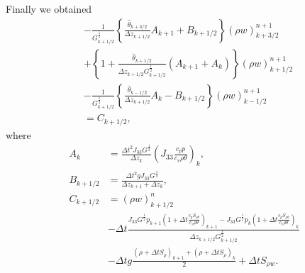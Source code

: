 Finally we obtained
\begin{align}
  &-\frac{1}{G^{\frac{1}{2}}_{k+1/2}}\left\{
    \frac{\hat{\theta}_{k+3/2}}{\Delta z_{k+1/2}}A_{k+1} + B_{k+1/2}
  \right\} (\rho w)_{k+3/2}^{n+1} \\
  &+ \left\{ 1 + \frac{\hat{\theta}_{k+1/2}}{\Delta z_{k+1/2} G^{\frac{1}{2}}_{k+1/2}}(A_{k+1} + A_k)  \right\} (\rho w)_{k+1/2}^{n+1} \\
  &- \frac{1}{G^{\frac{1}{2}}_{k+1/2}}\left\{
  \frac{\hat{\theta}_{k-1/2}}{\Delta z_{k+1/2}}A_k - B_{k+1/2}
  \right\} (\rho w)_{k-1/2}^{n+1} \\
  &= C_{k+1/2},
\end{align}
where
\begin{align}
  A_k &= \frac{\Delta t^2 J_{33}G^{\frac{1}{2}} }{\Delta z_k}\left(J_{33}\frac{c_pp}{c_v\rho\theta}\right)_k, \\
  B_{k+1/2} &= \frac{\Delta t^2 g J_{33}G^{\frac{1}{2}}}{\Delta z_{k+1}+\Delta z_k}, \\
  C_{k+1/2} &=
  (\rho w)_{k+1/2}^n \nonumber \\&
  -\Delta t\frac{
  J_{33}G^{\frac{1}{2}}p_{k+1}\left(1+\Delta t\frac{c_pS_{\rho\theta}}{c_v\rho\theta}\right)_{k+1}
  - J_{33}G^{\frac{1}{2}} p_k\left(1+\Delta t\frac{c_pS_{\rho\theta}}{c_v\rho\theta}\right)_k}{\Delta z_{k+1/2} G^{\frac{1}{2}}_{k+1/2}} \nonumber\\ &
  -\Delta t g \frac{(\rho+\Delta t S_\rho)_{k+1}+(\rho+\Delta t S_\rho)_k}{2} + \Delta t S_{\rho w}.
\end{align}
